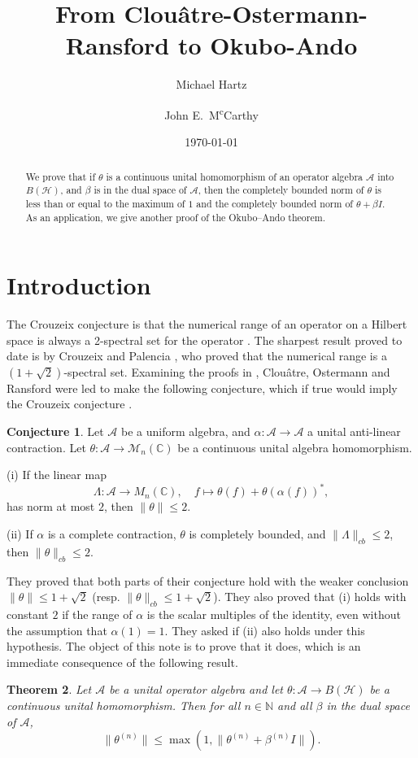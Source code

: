 \documentclass[12pt]{amsart}
\title{From Clou\^atre-Ostermann-Ransford to Okubo-Ando}
\author[M. Hartz]{Michael Hartz}
\author[J. E. M\textsuperscript{c}Carthy]{John E.\ M\textsuperscript{c}Carthy}
\date{\today}
\newtheorem{theorem}{Theorem}[section]
\theoremstyle{definition}
\newtheorem{conjecture}[theorem]{Conjecture}
\newcommand{\A}{{\mathcal A}}
\newcommand\C{{\mathbb C}}
\newcommand\matn{{\mathcal M}_n}
\begin{document}
\begin{abstract}
We prove that if $\theta$ is a continuous unital homomorphism of an operator algebra $\A$ into $B(\mathcal{H})$, and $\beta$ is in the dual space of $\A$, then the completely bounded norm of $\theta$ is less than or equal to the maximum of $1$ and the completely bounded norm of $\theta + \beta I $. As an application, we give another proof of the Okubo--Ando theorem.
\end{abstract}

\maketitle

\section{Introduction}
The Crouzeix conjecture is that the numerical range of an operator on a Hilbert space is always a 2-spectral set for the operator \cite{Crouzeix07}.
The sharpest result proved to date is by Crouzeix and Palencia \cite{CP17}, who proved that the numerical range is a $(1 + \sqrt{2})$-spectral set.
Examining the proofs in \cite{CP17,RS17}, Clou\^atre, Ostermann and Ransford were led to make the following conjecture, which if true would imply the Crouzeix conjecture \cite{COR23}.
\begin{conjecture} \cite{COR23}
Let $\A$ be a uniform algebra, and $\alpha: \A \to \A$ a unital anti-linear contraction.
Let $\theta: \A \to \matn(\C)$ be a continuous unital algebra homomorphism.

(i) 
If the linear map 
\[
\Lambda: \mathcal{A} \to M_n(\mathbb{C}), \quad f \mapsto \theta(f) + \theta (\alpha(f))^*,
\]
has norm at most $2$, then $\| \theta \| \leq 2$.

(ii) If $\alpha$ is a complete contraction, $\theta$ is completely bounded, and $\| \Lambda \|_{cb} \le 2$, then 
$\| \theta \|_{cb} \le 2$.
\end{conjecture}
They proved that  both parts of their conjecture hold with the weaker conclusion $\| \theta \| \le 1 + \sqrt{2} $ (resp. $\| \theta \|_{cb} \le 1 + \sqrt{2}$). They also proved that (i) 
  holds with constant $2$ if the range of $\alpha $ is the scalar multiples of the identity, even without the assumption that $\alpha(1) = 1$.
  They asked if (ii) also holds under this hypothesis. The object of this note is to prove that it does,
  which is an immediate consequence of the following result.
\begin{theorem}
  \label{thm:main_OA}
  Let $\mathcal{A}$ be a unital operator algebra and let $\theta: \mathcal{A} \to B(\mathcal{H})$ be a continuous unital
  homomorphism. Then for all $n \in \mathbb{N}$ and all $\beta$ in the dual space of $\mathcal{A}$,
  \begin{equation*}
    \|\theta^{(n)}\| \le \max(1,  \|\theta^{(n)} + \beta^{(n)} I \|).
  \end{equation*}
\end{theorem}
\end{document}
